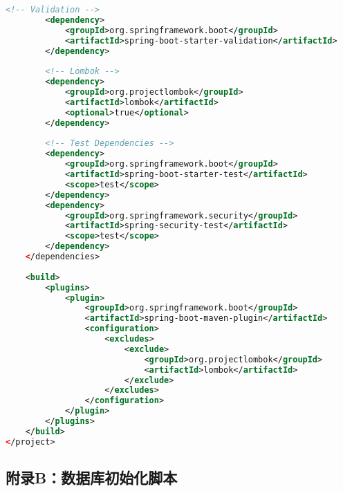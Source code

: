 \documentclass[12pt,a4paper]{article}
\begin{document}
\begin{lstlisting}[language=xml]
        <!-- Validation -->
        <dependency>
            <groupId>org.springframework.boot</groupId>
            <artifactId>spring-boot-starter-validation</artifactId>
        </dependency>
        
        <!-- Lombok -->
        <dependency>
            <groupId>org.projectlombok</groupId>
            <artifactId>lombok</artifactId>
            <optional>true</optional>
        </dependency>
        
        <!-- Test Dependencies -->
        <dependency>
            <groupId>org.springframework.boot</groupId>
            <artifactId>spring-boot-starter-test</artifactId>
            <scope>test</scope>
        </dependency>
        <dependency>
            <groupId>org.springframework.security</groupId>
            <artifactId>spring-security-test</artifactId>
            <scope>test</scope>
        </dependency>
    </dependencies>
    
    <build>
        <plugins>
            <plugin>
                <groupId>org.springframework.boot</groupId>
                <artifactId>spring-boot-maven-plugin</artifactId>
                <configuration>
                    <excludes>
                        <exclude>
                            <groupId>org.projectlombok</groupId>
                            <artifactId>lombok</artifactId>
                        </exclude>
                    </excludes>
                </configuration>
            </plugin>
        </plugins>
    </build>
</project>
\end{lstlisting}

\subsection*{附录B：数据库初始化脚本}
\end{document}
